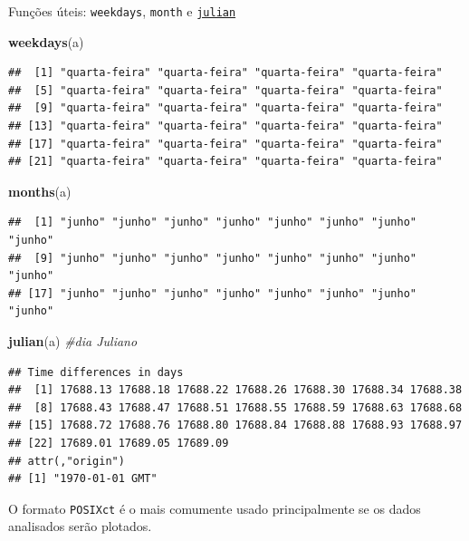 \documentclass[]{book}
\newenvironment{Shaded}{\begin{snugshade}}{\end{snugshade}}
\newcommand{\KeywordTok}[1]{\textcolor[rgb]{0.13,0.29,0.53}{\textbf{#1}}}
\newcommand{\CommentTok}[1]{\textcolor[rgb]{0.56,0.35,0.01}{\textit{#1}}}
\newcommand{\NormalTok}[1]{#1}
\theoremstyle{definition}
\theoremstyle{definition}
\theoremstyle{definition}
\theoremstyle{remark}
\begin{document}
Funções úteis: \texttt{weekdays}, \texttt{month} e
\href{https://en.wikipedia.org/wiki/Julian_day}{\texttt{julian}}

\begin{Shaded}
\begin{Highlighting}[]
\KeywordTok{weekdays}\NormalTok{(a)}
\end{Highlighting}
\end{Shaded}

\begin{verbatim}
##  [1] "quarta-feira" "quarta-feira" "quarta-feira" "quarta-feira"
##  [5] "quarta-feira" "quarta-feira" "quarta-feira" "quarta-feira"
##  [9] "quarta-feira" "quarta-feira" "quarta-feira" "quarta-feira"
## [13] "quarta-feira" "quarta-feira" "quarta-feira" "quarta-feira"
## [17] "quarta-feira" "quarta-feira" "quarta-feira" "quarta-feira"
## [21] "quarta-feira" "quarta-feira" "quarta-feira" "quarta-feira"
\end{verbatim}

\begin{Shaded}
\begin{Highlighting}[]
\KeywordTok{months}\NormalTok{(a)}
\end{Highlighting}
\end{Shaded}

\begin{verbatim}
##  [1] "junho" "junho" "junho" "junho" "junho" "junho" "junho" "junho"
##  [9] "junho" "junho" "junho" "junho" "junho" "junho" "junho" "junho"
## [17] "junho" "junho" "junho" "junho" "junho" "junho" "junho" "junho"
\end{verbatim}

\begin{Shaded}
\begin{Highlighting}[]
\KeywordTok{julian}\NormalTok{(a) }\CommentTok{#dia Juliano}
\end{Highlighting}
\end{Shaded}

\begin{verbatim}
## Time differences in days
##  [1] 17688.13 17688.18 17688.22 17688.26 17688.30 17688.34 17688.38
##  [8] 17688.43 17688.47 17688.51 17688.55 17688.59 17688.63 17688.68
## [15] 17688.72 17688.76 17688.80 17688.84 17688.88 17688.93 17688.97
## [22] 17689.01 17689.05 17689.09
## attr(,"origin")
## [1] "1970-01-01 GMT"
\end{verbatim}

O formato \texttt{POSIXct} é o mais comumente usado principalmente se os
dados analisados serão plotados.
\end{document}
